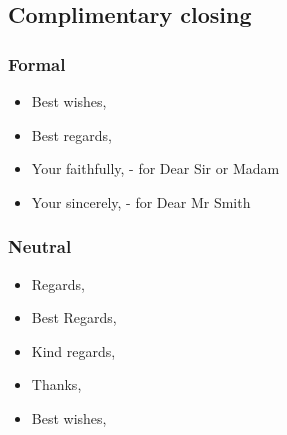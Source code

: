 \subsection{Complimentary closing}
\subsubsection{Formal}
\begin{itemize}
\item Best wishes,
\item Best regards,
\item Your faithfully, - for Dear Sir or Madam
\item Your sincerely, - for Dear Mr Smith
\end{itemize}


\subsubsection{Neutral}
\begin{itemize}
\item Regards,
\item Best Regards,
\item Kind regards,
\item Thanks,
\item Best wishes,
\end{itemize}